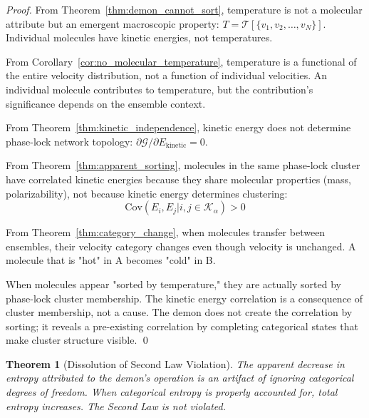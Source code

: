 \documentclass[12pt,a4paper]{article}
\newtheorem{theorem}{Theorem}[section]
\theoremstyle{definition}
\theoremstyle{remark}
\newcommand{\phaselockgraph}{\mathcal{G}}
\begin{document}
\begin{proof}
From Theorem~\ref{thm:demon_cannot_sort}, temperature is not a molecular attribute but an emergent macroscopic property: $T = \mathcal{T}[\{v_1, v_2, \ldots, v_N\}]$. Individual molecules have kinetic energies, not temperatures.

From Corollary~\ref{cor:no_molecular_temperature}, temperature is a functional of the entire velocity distribution, not a function of individual velocities. An individual molecule contributes to temperature, but the contribution's significance depends on the ensemble context.

From Theorem~\ref{thm:kinetic_independence}, kinetic energy does not determine phase-lock network topology: $\partial \phaselockgraph / \partial E_{\text{kinetic}} = 0$.

From Theorem~\ref{thm:apparent_sorting}, molecules in the same phase-lock cluster have correlated kinetic energies because they share molecular properties (mass, polarizability), not because kinetic energy determines clustering:
\begin{equation}
\text{Cov}(E_i, E_j | i, j \in \mathcal{K}_\alpha) > 0
\end{equation}

From Theorem~\ref{thm:category_change}, when molecules transfer between ensembles, their velocity category changes even though velocity is unchanged. A molecule that is "hot" in A becomes "cold" in B.

When molecules appear "sorted by temperature," they are actually sorted by phase-lock cluster membership. The kinetic energy correlation is a consequence of cluster membership, not a cause. The demon does not create the correlation by sorting; it reveals a pre-existing correlation by completing categorical states that make cluster structure visible. \qed
\end{proof}

\begin{theorem}[Dissolution of Second Law Violation]
\label{thm:dissolution_second_law}
The apparent decrease in entropy attributed to the demon's operation is an artifact of ignoring categorical degrees of freedom. When categorical entropy is properly accounted for, total entropy increases. The Second Law is not violated.
\end{theorem}
\end{document}
